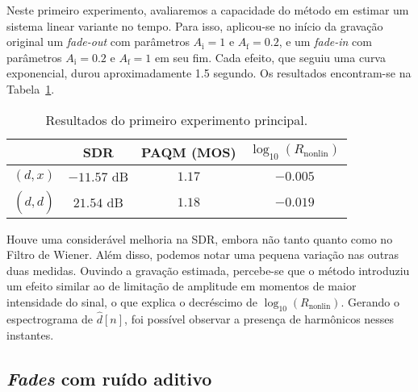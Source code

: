 Neste primeiro experimento, avaliaremos a capacidade do método em estimar um sistema linear variante no tempo. Para isso, aplicou-se no início da gravação original um \textit{fade-out} com parâmetros $A_\text{i} = 1$ e $A_\text{f} = 0.2$, e um \textit{fade-in} com parâmetros $A_\text{i} = 0.2$ e $A_\text{f} = 1$ em seu fim. Cada efeito, que seguiu uma curva exponencial, durou aproximadamente 1.5 segundo. Os resultados encontram-se na Tabela~\ref{tab:correntropy:experiment-1}.
{\def\arraystretch{1.25}\tabcolsep=10pt
\begin{table}[!ht]
    \centering
    \caption[Resultados do primeiro experimento: \textit{fades}]{Resultados do primeiro experimento principal.}
    \label{tab:correntropy:experiment-1}
    \begin{tabular}{cccc}
        \toprule
                         & SDR        & PAQM (MOS)   & $\log_{10}(R_{\text{nonlin}})$ \\
        \midrule
        $(d, x)$       &  $-11.57$ dB &  $1.17$ & $-0.005$          \\
        $(d, \hat{d})$ & $21.54$ dB & $1.18$    & $-0.019$         \\ \bottomrule
    \end{tabular}
\end{table}
}

Houve uma considerável melhoria na SDR, embora não tanto quanto como no Filtro de Wiener. Além disso, podemos notar uma pequena variação nas outras duas medidas. Ouvindo a gravação estimada, percebe-se que o método introduziu um efeito similar ao de limitação de amplitude em momentos de maior intensidade do sinal, o que explica o decréscimo de $\log_{10}(R_{\text{nonlin}})$. Gerando o espectrograma de $\hat{d}[n]$, foi possível observar a presença de harmônicos nesses instantes.

\subsection{\textit{Fades} com ruído aditivo}

